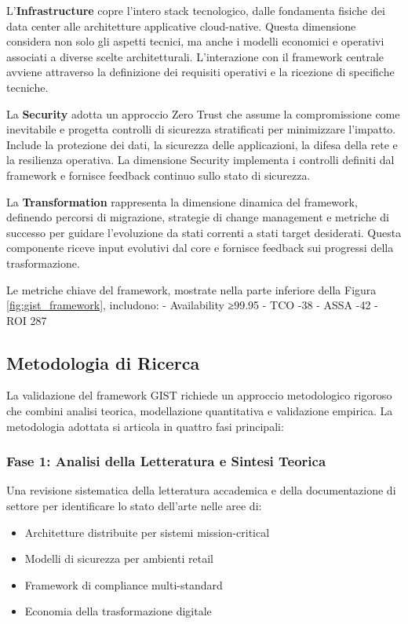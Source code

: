 \begin{bibunit}[IEEEtran]
L'\textbf{Infrastructure} copre l'intero stack tecnologico, dalle fondamenta fisiche dei data center alle architetture applicative cloud-native. Questa dimensione considera non solo gli aspetti tecnici, ma anche i modelli economici e operativi associati a diverse scelte architetturali. L'interazione con il framework centrale avviene attraverso la definizione dei requisiti operativi e la ricezione di specifiche tecniche.

La \textbf{Security} adotta un approccio Zero Trust che assume la compromissione come inevitabile e progetta controlli di sicurezza stratificati per minimizzare l'impatto. Include la protezione dei dati, la sicurezza delle applicazioni, la difesa della rete e la resilienza operativa. La dimensione Security implementa i controlli definiti dal framework e fornisce feedback continuo sullo stato di sicurezza.

La \textbf{Transformation} rappresenta la dimensione dinamica del framework, definendo percorsi di migrazione, strategie di change management e metriche di successo per guidare l'evoluzione da stati correnti a stati target desiderati. Questa componente riceve input evolutivi dal core e fornisce feedback sui progressi della trasformazione.

Le metriche chiave del framework, mostrate nella parte inferiore della Figura \ref{fig:gist_framework}, includono:
- Availability ≥99.95%
- TCO -38%
- ASSA -42%
- ROI 287%

\subsection{Metodologia di Ricerca}

La validazione del framework GIST richiede un approccio metodologico rigoroso che combini analisi teorica, modellazione quantitativa e validazione empirica. La metodologia adottata si articola in quattro fasi principali:

\subsubsection{Fase 1: Analisi della Letteratura e Sintesi Teorica}

Una revisione sistematica della letteratura accademica e della documentazione di settore per identificare lo stato dell'arte nelle aree di:
\begin{itemize}
\item Architetture distribuite per sistemi mission-critical
\item Modelli di sicurezza per ambienti retail
\item Framework di compliance multi-standard
\item Economia della trasformazione digitale
\end{itemize}


\end{bibunit}
